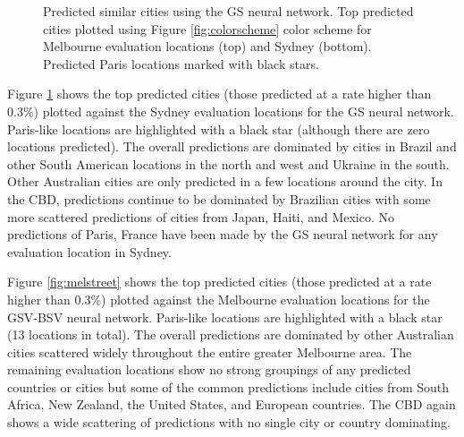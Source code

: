 \documentclass[sageh,times]{sagej}
\begin{document}
\begin{figure}[!htbp]
\caption{Predicted similar cities using the GS neural network. Top predicted cities plotted using Figure \ref{fig:colorscheme} color scheme for Melbourne evaluation locations (top) and Sydney (bottom). Predicted Paris locations marked with black stars.} 
 \label{fig:melsat}  
\end{figure} 


Figure \ref{fig:melsat} shows the top predicted cities (those predicted at a rate higher than 0.3\%) plotted against the Sydney evaluation locations for the GS neural network. Paris-like locations are highlighted with a black star (although there are zero locations predicted). The overall predictions are dominated by cities in Brazil and other South American locations in the north and west and Ukraine in the south. Other Australian cities are only predicted in a few locations around the city. In the CBD, predictions continue to be dominated by Brazilian cities with some more scattered predictions of cities from Japan, Haiti, and Mexico. No predictions of Paris, France have been made by the GS neural network for any evaluation location in Sydney.





Figure \ref{fig:melstreet} shows the top predicted cities (those predicted at a rate higher than 0.3\%) plotted against the Melbourne evaluation locations for the GSV-BSV neural network. Paris-like locations are highlighted with a black star (13 locations in total). The overall predictions are dominated by other Australian cities scattered widely throughout the entire greater Melbourne area. The remaining evaluation locations show no strong groupings of any predicted countries or cities but some of the common predictions include cities from South Africa, New Zealand, the United States, and European countries. The CBD again shows a wide scattering of predictions with no single city or country dominating.
\end{document}
